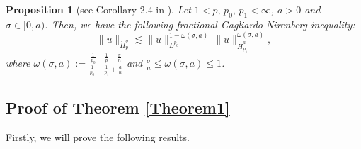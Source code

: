 \documentclass[11pt,reqno]{amsart}
\newtheorem{proposition}{Proposition}[section]
\begin{document}
\begin{proposition}[see Corollary 2.4 in \cite{Hajaiej2011}]  \label{fractionalGagliardoNirenberg}
Let $1<p,\,p_0,\,p_1<\infty$, $a >0$ and $\sigma\in [0,a)$. Then, we have the following fractional Gagliardo-Nirenberg inequality:
$$ \|u\|_{\dot{H}^{\sigma}_p} \lesssim \|u\|_{L^{p_0}}^{1-\omega(\sigma,a)}\, \|u\|_{\dot{H}^{a}_{p_1}}^{\omega(\sigma,a)}, $$
where $\omega(\sigma,a) :=\displaystyle\frac{\frac{1}{p_0}-\frac{1}{p}+\frac{\sigma}{n}}{\frac{1}{p_0}-\frac{1}{p_1}+\frac{a}{n}}$ and $\displaystyle\frac{\sigma}{a}\leq \omega(\sigma,a) \leq 1$.
\end{proposition}

\subsection{Proof of Theorem \ref{Theorem1}} Firstly, we will prove the following results.
\vspace{0.2cm}
\end{document}
